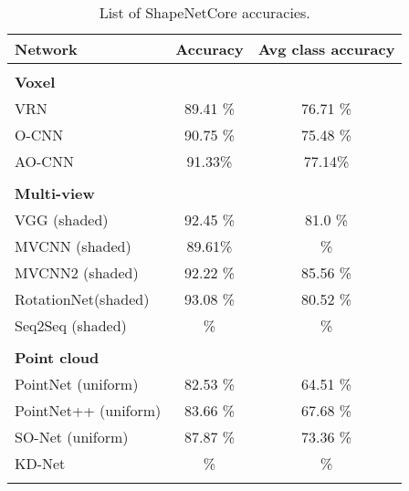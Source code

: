 \begin{table}[]
	\centering
	\begin{tabular}{lcc}
		\hline
		\textbf{Network}       & \textbf{Accuracy }& \textbf{Avg class accuracy }\\ \hline
		                       &          &                    \\
		\textbf{Voxel }        &          &                    \\
		VRN                    & 89.41 \% &      76.71 \%      \\
		O-CNN                  & 90.75 \% &      75.48 \%      \\
		AO-CNN                 & 91.33\%  &      77.14\%       \\
		                       &          &                    \\
		\textbf{Multi-view }   &          &                    \\
		VGG (shaded)           & 92.45 \% &      81.0 \%       \\
		MVCNN (shaded)         & 89.61\%  &         \%         \\
		MVCNN2 (shaded)        & 92.22 \% &      85.56 \%      \\
		RotationNet(shaded)    & 93.08 \% &      80.52 \%      \\
		Seq2Seq (shaded)       &    \%    &         \%         \\
		                       &          &                    \\
		\textbf{Point cloud  } &          &                    \\
		PointNet (uniform)     & 82.53 \% &      64.51 \%      \\
		PointNet++ (uniform)   & 83.66 \% &      67.68 \%      \\
		SO-Net (uniform)       & 87.87 \% &      73.36 \%      \\
		KD-Net                 &    \%    &         \%         \\
		                       &          &                    \\ \hline
	\end{tabular}
\caption{List of ShapeNetCore accuracies.}
\label{Table:saccs}
\end{table}